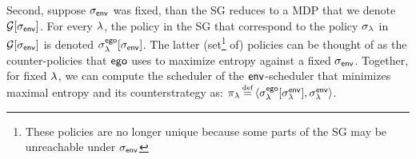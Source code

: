 Second, suppose ${\sigma_{\mathsf{env}}}$ was fixed, than the SG reduces to 
a MDP that we denote $\mathcal{G}[{\sigma_{\mathsf{env}}}]$.
For every $\lambda$, the policy in the SG that correspond to the policy $\sigma_\lambda$ in $\mathcal{G}[{\sigma_{\mathsf{env}}}]$ is denoted $\sigma^{\mathsf{ego}}_\lambda[{\sigma_{\mathsf{env}}}]$.
The latter (set\footnote{These policies are no longer unique because some parts of the SG may be unreachable under ${\sigma_{\mathsf{env}}}$} of) policies can be thought of as the counter-policies that $\mathsf{ego}$ uses to maximize entropy against a fixed ${\sigma_{\mathsf{env}}}$. 
Together, for fixed $\lambda$, we can compute the scheduler of the $\mathsf{env}$-scheduler that minimizes maximal entropy and its counterstrategy as: $\pi_\rat \eqdef \langle
\sched^\pOne_\rat[\sched_\rat^\pTwo] , \sched_\rat^\pTwo \rangle$.
%

